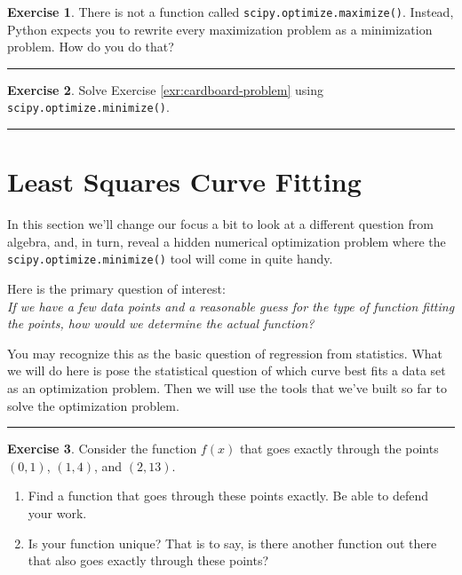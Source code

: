 \documentclass[
]{book}
\theoremstyle{definition}
\theoremstyle{definition}
\theoremstyle{definition}
\newtheorem{exercise}{Exercise}[chapter]
\theoremstyle{remark}
\begin{document}
\begin{exercise}
\protect\hypertarget{exr:unnamed-chunk-235}{}{\label{exr:unnamed-chunk-235} }There is not a function called \texttt{scipy.optimize.maximize()}. Instead, Python expects you to rewrite every maximization problem as a minimization problem. How do you do that?
\end{exercise}

\begin{center}\rule{0.5\linewidth}{0.5pt}\end{center}

\begin{exercise}
\protect\hypertarget{exr:unnamed-chunk-236}{}{\label{exr:unnamed-chunk-236} }Solve Exercise \ref{exr:cardboard-problem} using \texttt{scipy.optimize.minimize()}.
\end{exercise}

\begin{center}\rule{0.5\linewidth}{0.5pt}\end{center}

\hypertarget{least-squares-curve-fitting}{%
\section{Least Squares Curve Fitting}\label{least-squares-curve-fitting}}

In this section we'll change our focus a bit to look at a different question from algebra, and, in turn, reveal a hidden numerical optimization problem where the \texttt{scipy.optimize.minimize()} tool will come in quite handy.

Here is the primary question of interest:\\
\emph{If we have a few data points and a reasonable guess for the type of function fitting the points, how would we determine the actual function?}

You may recognize this as the basic question of regression from statistics. What we will do here is pose the statistical question of which curve best fits a data set as an optimization problem. Then we will use the tools that we've built so far to solve the optimization problem.

\begin{center}\rule{0.5\linewidth}{0.5pt}\end{center}

\begin{exercise}
\protect\hypertarget{exr:unnamed-chunk-237}{}{\label{exr:unnamed-chunk-237} }Consider the function \(f(x)\) that goes exactly through the points
\((0,1)\), \((1,4)\), and \((2,13)\).

\begin{enumerate}
\def\labelenumi{\alph{enumi}.}
\item
  Find a function that goes through these points exactly. Be able to
  defend your work.
\item
  Is your function unique? That is to say, is there another function
  out there that also goes exactly through these points?
\end{enumerate}
\end{exercise}
\end{document}

